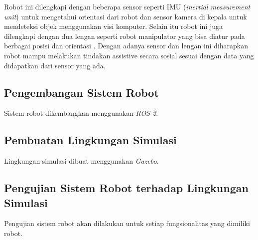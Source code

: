 Robot ini dilengkapi dengan beberapa sensor seperti IMU (\emph{inertial measurement unit}) untuk mengetahui orientasi dari robot dan sensor kamera di kepala untuk mendeteksi objek menggunakan visi komputer.
Selain itu robot ini juga dilengkapi dengan dua lengan seperti robot manipulator yang bisa diatur pada berbagai posisi dan orientasi \citep{Iqbal2012}.
Dengan adanya sensor dan lengan ini diharapkan robot mampu melakukan tindakan assistive secara sosial sesuai dengan data yang didapatkan dari sensor yang ada.

\subsection{Pengembangan Sistem Robot}

Sistem robot dikembangkan menggunakan \emph{ROS 2}.

\subsection{Pembuatan Lingkungan Simulasi}

Lingkungan simulasi dibuat menggunakan \emph{Gazebo}.

\subsection{Pengujian Sistem Robot terhadap Lingkungan Simulasi}

Pengujian sistem robot akan dilakukan untuk setiap fungsionalitas yang dimiliki robot.
